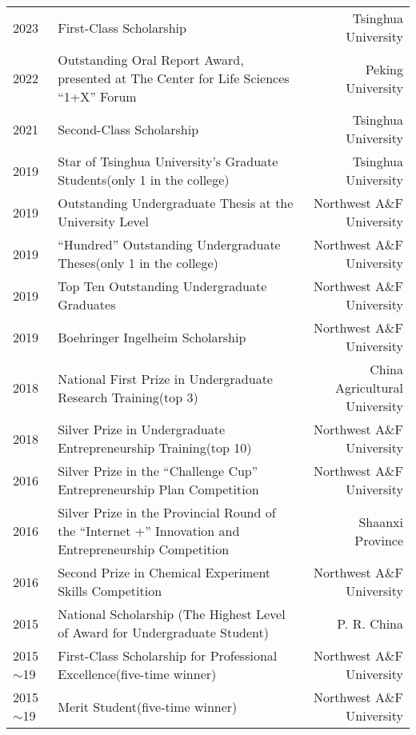 
\begin{longtable}[l]{@{}p{} p{} r}
    2023 & First-Class Scholarship & Tsinghua University \\
    2022 & Outstanding Oral Report Award, \newline presented at The Center for Life Sciences ``1+X'' Forum & Peking University \\
    2021 & Second-Class Scholarship & Tsinghua University \\
    2019 & Star of Tsinghua University's Graduate Students\newline (only 1 in the college) & Tsinghua University \\
    2019 & Outstanding Undergraduate Thesis at the University Level & Northwest A\&F University \\
    2019 & ``Hundred'' Outstanding Undergraduate Theses\newline (only 1 in the college) & Northwest A\&F University \\
    2019 & Top Ten Outstanding Undergraduate Graduates & Northwest A\&F University \\
    2019 & Boehringer Ingelheim Scholarship & Northwest A\&F University \\
    2018 & National First Prize in Undergraduate Research Training\newline (top 3) & China Agricultural University \\
    2018 & Silver Prize in Undergraduate Entrepreneurship Training\newline (top 10) & Northwest A\&F University \\
    2016 & Silver Prize in the ``Challenge Cup'' Entrepreneurship Plan Competition & Northwest A\&F University \\
    2016 & Silver Prize in the Provincial Round of the ``Internet +'' Innovation and Entrepreneurship Competition & Shaanxi Province \\
    2016 & Second Prize in Chemical Experiment Skills Competition & Northwest A\&F University \\
    2015 & National Scholarship \newline (The Highest Level of Award for Undergraduate Student) & P. R. China \\
    2015$\sim$19 & First-Class Scholarship for Professional Excellence\newline (five-time winner) & Northwest A\&F University \\
    2015$\sim$19 & Merit Student\newline (five-time winner) & Northwest A\&F University \\
    
    
\end{longtable}
